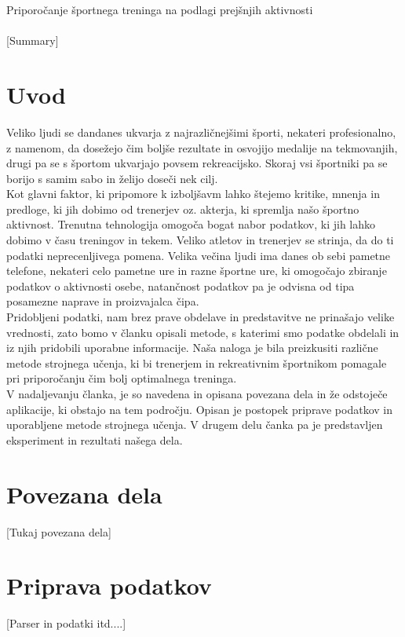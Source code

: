 \documentclass[a4paper,11pt]{article}
\begin{document}
\huge { Priporočanje športnega treninga na podlagi prejšnjih aktivnosti\\\\} 
\normalsize
[Summary]
\\

\begin{multicols}{2}

\section{Uvod}
Veliko ljudi se dandanes ukvarja z najrazličnejšimi športi, nekateri profesionalno, z namenom, da dosežejo čim boljše rezultate in osvojijo medalije na tekmovanjih, drugi pa se s športom ukvarjajo povsem rekreacijsko. Skoraj vsi športniki pa se borijo s samim sabo in želijo doseči nek cilj.\\
Kot glavni faktor, ki pripomore k izboljšavm lahko štejemo kritike, mnenja in predloge, ki jih dobimo od trenerjev oz. akterja, ki spremlja našo športno aktivnost. Trenutna tehnologija omogoča bogat nabor podatkov, ki jih lahko dobimo v času treningov in tekem. Veliko atletov in trenerjev se strinja, da do ti podatki neprecenljivega pomena\cite{Liebermann}. Velika večina ljudi ima danes ob sebi pametne telefone, nekateri celo pametne ure in razne športne ure, ki omogočajo zbiranje podatkov o aktivnosti osebe, natančnost podatkov pa je odvisna od tipa posamezne naprave in proizvajalca čipa\cite{Case}.\\
Pridobljeni podatki, nam brez prave obdelave in predstavitve ne prinašajo velike vrednosti, zato bomo v  članku opisali metode, s katerimi smo podatke obdelali in iz njih pridobili uporabne informacije. Naša naloga je bila preizkusiti različne metode strojnega učenja, ki bi trenerjem in rekreativnim športnikom pomagale pri priporočanju čim bolj optimalnega treninga.\\
V nadaljevanju članka, je so navedena in opisana povezana dela in že odstoječe aplikacije, ki obstajo na tem področju. Opisan je postopek priprave podatkov in uporabljene metode strojnega učenja. V drugem delu čanka pa je predstavljen eksperiment in rezultati našega dela.


\section{Povezana dela}
[Tukaj povezana dela]

\section{Priprava podatkov}
[Parser in podatki itd....]


\end{multicols}
\end{document}
